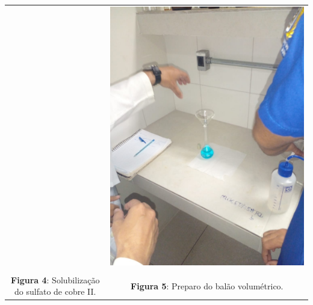 \documentclass[a4paper, 11pt]{article}
\begin{document}
\begin{center}
\begin{tabular}{c c}
                & \parbox{7cm}{\includegraphics[scale=0.2]{04. preparo do balao.jpeg}}\\
                \\
                \textbf{Figura 4}: Solubilização do sulfato de cobre II\@.
                & \textbf{Figura 5}: Preparo do balão volumétrico\@.\\
            \end{tabular}
        \end{center}
        \doublespacing
\end{document}
